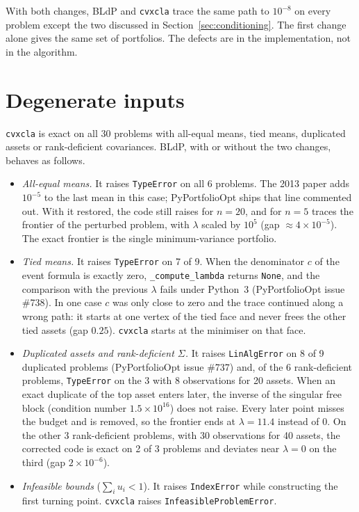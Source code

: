 \documentclass[11pt,a4paper]{article}
\newcommand{\code}[1]{\texttt{#1}}
\newcommand{\cvxcla}{\code{cvxcla}}
\begin{document}
With both changes, BLdP and \cvxcla{} trace the same path to $10^{-8}$ on every
problem except the two discussed in Section~\ref{sec:conditioning}. The first
change alone gives the same set of portfolios. The defects are in the
implementation, not in the algorithm.

\section{Degenerate inputs}\label{sec:degenerate}

\cvxcla{} is exact on all 30 problems with all-equal means, tied means,
duplicated assets or rank-deficient covariances. BLdP, with or without the two
changes, behaves as follows.

\begin{itemize}
  \item \emph{All-equal means.} It raises \code{TypeError} on all 6 problems.
    The 2013 paper adds $10^{-5}$ to the last mean in this case;
    PyPortfolioOpt ships that line commented out. With it restored, the code
    still raises for $n = 20$, and for $n = 5$ traces the frontier of the
    perturbed problem, with $\lambda$ scaled by $10^{5}$ (gap
    $\approx 4 \times 10^{-5}$). The exact frontier is the single
    minimum-variance portfolio.
  \item \emph{Tied means.} It raises \code{TypeError} on 7 of 9. When the
    denominator $c$ of the event formula is exactly zero,
    \code{\_compute\_lambda} returns \code{None}, and the comparison with the
    previous $\lambda$ fails under Python~3 (PyPortfolioOpt issue \#738). In one case $c$ was
    only close to zero and the trace continued along a wrong path: it starts
    at one vertex of the tied face and never frees the other tied assets
    (gap $0.25$). \cvxcla{} starts at the minimiser on that face.
  \item \emph{Duplicated assets and rank-deficient $\Sigma$.} It raises
    \code{LinAlgError} on 8 of 9 duplicated problems (PyPortfolioOpt issue
    \#737) and, of the 6 rank-deficient problems, \code{TypeError} on the 3
    with 8 observations for 20 assets. When an exact duplicate of the top asset enters later, the inverse
    of the singular free block (condition number $1.5 \times 10^{16}$) does
    not raise. Every later point misses the budget and is removed, so the
    frontier ends at $\lambda = 11.4$ instead of 0. On the other 3
    rank-deficient problems, with 30 observations for 40 assets, the corrected code is exact on 2 of 3 problems and deviates
    near $\lambda = 0$ on the third (gap $2 \times 10^{-6}$).
  \item \emph{Infeasible bounds} ($\sum_i u_i < 1$). It raises
    \code{IndexError} while constructing the first turning point. \cvxcla{}
    raises \code{InfeasibleProblemError}.
\end{itemize}
\end{document}
